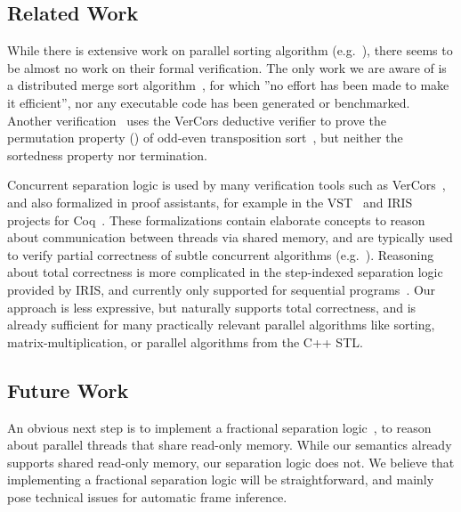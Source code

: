 \documentclass[sn-mathphys,Numbered]{sn-jnl}
\theoremstyle{thmstyleone}%
\theoremstyle{definition}%
\theoremstyle{thmstylethree}%
\begin{document}


    \subsection{Related Work}
    While there is extensive work on parallel sorting algorithm (e.g.~\cite{AWFS22,CNLM08,AMI21}),
    there seems to be almost no work on their formal verification. The only work we are aware of is
    a distributed merge sort algorithm~\cite{HKBK20}, for which ''no effort has been made to make it efficient''\cite[Sec.~2]{HKBK20},
    nor any executable code has been generated or benchmarked. Another verification~\cite{SaHu20} uses
    the VerCors deductive verifier to prove the permutation property ()
    of odd-even transposition sort~\cite{Ha72}, but neither the sortedness property nor termination.

    Concurrent separation logic is used by many verification tools such
    as VerCors~\cite{Vercors}, and also formalized in proof assistants, for example in the VST~\cite{VST}
    and IRIS~\cite{JKJA18} projects for Coq~\cite{BeCa10}. These formalizations contain elaborate concepts to
    reason about communication between threads via shared memory, and are typically used to
    verify partial correctness of subtle concurrent algorithms (e.g.~\cite{MeJo21}).
    Reasoning about total correctness is more complicated in the step-indexed separation logic provided by IRIS,
    and currently only supported for sequential programs~\cite{SGGT21}.
    Our approach is less expressive, but naturally supports total correctness, and is already sufficient for
    many practically relevant parallel algorithms like sorting, matrix-multiplication, or parallel algorithms from
    the C++ STL.



%


    \subsection{Future Work}
      An obvious next step is to implement a fractional separation logic~\cite{BCOP05},
      to reason about parallel threads that share read-only memory. While our semantics
      already supports shared read-only memory, our separation logic does not.
      We believe that implementing a fractional separation logic will be straightforward,
      and mainly pose technical issues for automatic frame inference.
\end{document}

